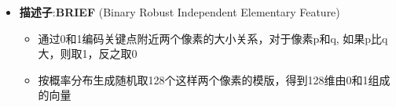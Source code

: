 \documentclass[../main.tex]{subfiles}
\begin{document}
\begin{enumerate}
\begin{itemize}
\begin{enumerate}
\begin{itemize}
\begin{itemize}
\begin{itemize}
                                                \textbf{FAST}：Features from Accelerated Segment Test，以像素点为中心一定半径的圆上，有连续N个点与像素灰度值差大于阈值
                                                \textbf{Oriented FAST}：FAST的优化，通过构建\textbf{图像金字塔}\footnote{在不同尺度（图像大小）下都能检测到稳定的特征点，将原始图像逐层下采样，形成多层图像，使物体在图像中变大或变小，检测出的关键点位置仍然一致。}和\textbf{灰度质心法}\footnote{它通过计算角点邻域的灰度质心（intensity centroid）来求出主方向角，根据灰度值总和与坐标-灰度值乘积总和计算质心坐标。无论图像如何旋转，ORB都会调整描述子的方向，使得特征点的描述结果保持一致}使特征具有\textbf{尺度不变性（图像金字塔）和旋转不变性（灰度质心法）}

                                        \end{itemize}
                                    \item \textbf{描述子}:\textbf{BRIEF} (Binary Robust Independent Elementary Feature)
                                        \begin{itemize}
                                            \item 通过0和1编码关键点附近两个像素的大小关系，对于像素p和q, 如果p比q大，则取1，反之取0
                                            \item 按概率分布生成随机取128个这样两个像素的模版，得到128维由0和1组成的向量
                                        \end{itemize}
                                \end{itemize}
                            

\end{itemize}
\end{enumerate}
\end{itemize}
\end{enumerate}
\end{document}
